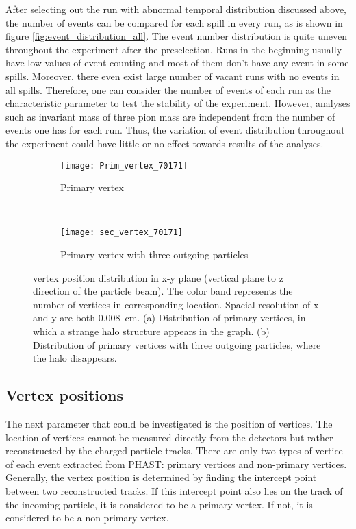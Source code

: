 After selecting out the run with abnormal temporal distribution discussed above, the number of events can be compared for each spill in every run, as is shown in figure \ref{fig:event_distribution_all}. The event number distribution is quite uneven throughout the experiment after the preselection. Runs in the beginning usually have low values of event counting and most of them don't have any event in some spills. Moreover, there even exist large number of vacant runs with no events in all spills. Therefore, one can consider the number of events of each run as the characteristic parameter to test the stability of the experiment. However, analyses such as invariant mass of three pion mass are independent from the number of events one has for each run. Thus, the variation of event distribution throughout the experiment could have little or no effect towards results of the analyses.
\begin{figure}[!b]
	\centering
	\begin{subfigure}[t]{0.5\textwidth}
		\texttt{[image: Prim\_vertex\_70171]}
		\caption{Primary vertex}
		\label{fig:Prim_vertex_70171}
	\end{subfigure}
	~ %
	\begin{subfigure}[b]{0.5\textwidth}
		\texttt{[image: sec\_vertex\_70171]}
		\caption{Primary vertex with three outgoing particles}
		\label{fig:sec_vertex_70171}
	\end{subfigure}
	\caption{vertex position distribution in x-y plane (vertical plane to z direction of the particle beam). The color band represents the number of vertices in corresponding location. Spacial resolution of x and y are both \SI{0.008}{\centi\meter}. (a) Distribution of primary vertices, in which a strange halo structure appears in the graph. (b) Distribution of primary vertices with three outgoing particles, where the halo disappears.}
	\label{fig:ver_pos}
\end{figure}
\subsection{Vertex positions}
The next parameter that could be investigated is the position of vertices. The location of vertices cannot be measured directly from the detectors but rather reconstructed by the charged particle tracks. There are only two types of vertice of each event extracted from PHAST: primary vertices and non-primary vertices. Generally, the vertex position is determined by finding the intercept point between two reconstructed tracks. If this intercept point also lies on the track of the incoming particle, it is considered to be a primary vertex. If not, it is considered to be a non-primary vertex. 


